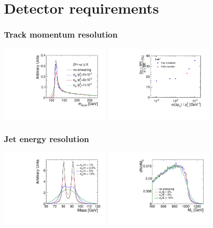 \documentclass{beamer}
\begin{document}
\section{Detector requirements}
\begin{frame}
\frametitle{Track momentum resolution}
\includegraphics[width=5.5cm]{higgs.pdf}
\includegraphics[width=5.5cm]{higgs_mumu_momres_dependence_2ab.pdf}
\end{frame}
\begin{frame}
\frametitle{Jet energy resolution}
\includegraphics[width=5.5cm]{wzSeparation.pdf}
\includegraphics[width=5.5cm]{SquarkEndpoint.pdf}
\end{frame}
\end{document}
